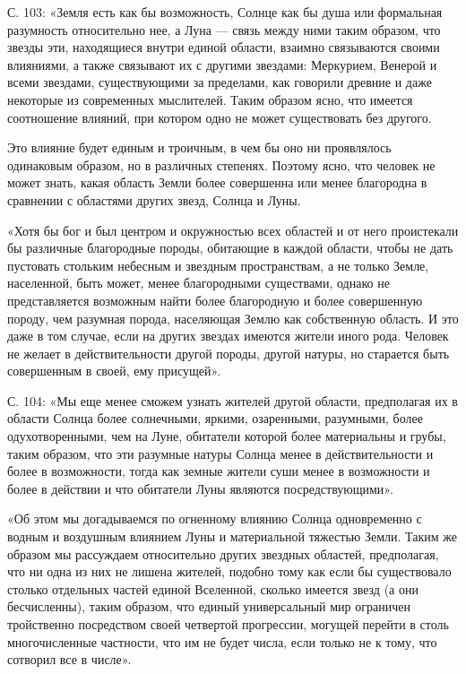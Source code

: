 С. 103: «Земля есть как бы возможность, Солнце как бы душа или
формальная разумность относительно нее, а Луна --- связь между ними
таким образом, что звезды эти, находящиеся внутри единой области,
взаимно связываются своими влияниями, а также связывают их с другими
звездами: Меркурием, Венерой и всеми звездами, существующими за
пределами, как говорили древние и даже некоторые из современных
мыслителей. Таким образом ясно, что имеется соотношение влияний, при
котором одно не может существовать без другого.

Это влияние будет единым и троичным, в чем бы оно ни проявлялось
одинаковым образом, но в различных степенях. Поэтому ясно, что человек
не может знать, какая область Земли более совершенна или менее
благородна в сравнении с областями других звезд, Солнца и Луны.

«Хотя бы бог и был центром и окружностью всех областей и от него
проистекали бы различные благородные породы, обитающие в каждой
области, чтобы не дать пустовать стольким небесным и звездным
пространствам, а не только Земле, населенной, быть может, менее
благородными существами, однако не представляется возможным найти
более благородную и более совершенную породу, чем разумная порода,
населяющая Землю как собственную область. И это даже в том случае,
если на других звездах имеются жители иного рода. Человек не желает в
действительности другой породы, другой натуры, но старается быть
совершенным в своей, ему присущей».

С. 104: «Мы еще менее сможем узнать жителей другой области,
предполагая их в области Солнца более солнечными, яркими, озаренными,
разумными, более одухотворенными, чем на Луне, обитатели которой более
материальны и грубы, таким образом, что эти разумные натуры Солнца
менее в действительности и более в возможности, тогда как земные
жители суши менее в возможности и более в действии и что обитатели
Луны являются посредствующими».

«Об этом мы догадываемся по огненному влиянию Солнца одновременно с
водным и воздушным влиянием Луны и материальной тяжестью Земли. Таким
же образом мы рассуждаем относительно других звездных областей,
предполагая, что ни одна из них не лишена жителей, подобно тому как
если бы существовало столько отдельных частей единой Вселенной,
сколько имеется звезд (а они бесчисленны), таким образом, что единый
универсальный мир ограничен тройственно посредством своей четвертой
прогрессии, могущей перейти в столь многочисленные частности, что им
не будет числа, если только не к тому, что сотворил все в числе».

